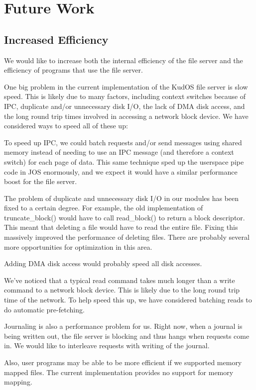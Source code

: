 \section{Future Work}
\label{sec:future}

\subsection{Increased Efficiency}

We would like to increase both the internal efficiency of the file server and
the efficiency of programs that use the file server.

One big problem in the current implementation of the KudOS file server is slow
speed. This is likely due to many factors, including context switches because of
IPC, duplicate and/or unnecessary disk I/O, the lack of DMA disk access, and the
long round trip times involved in accessing a network block device. We have
considered ways to speed all of these up:

To speed up IPC, we could batch requests and/or send messages using shared
memory instead of needing to use an IPC message (and therefore a context switch)
for each page of data. This same technique sped up the userspace pipe code in
JOS enormously, and we expect it would have a similar performance boost for the
file server.

The problem of duplicate and unnecessary disk I/O in our modules has been fixed
to a certain degree. For example, the old implementation of truncate\_block()
would have to call read\_block() to return a block descriptor. This meant that
deleting a file would have to read the entire file. Fixing this massively
improved the performance of deleting files. There are probably several more
opportunities for optimization in this area.

Adding DMA disk access would probably speed all disk accesses.

We've noticed that a typical read command takes much longer than a write command
to a network block device. This is likely due to the long round trip time of the
network. To help speed this up, we have considered batching reads to do
automatic pre-fetching.

Journaling is also a performance problem for us. Right now, when a journal is
being written out, the file server is blocking and thus hangs when requests come
in. We would like to interleave requests with writing of the journal.

Also, user programs may be able to be more efficient if we supported memory
mapped files. The current implementation provides no support for memory mapping.

